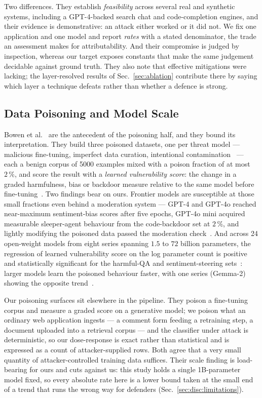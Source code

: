 Two differences. They establish \emph{feasibility} across several real
and synthetic systems, including a GPT-4-backed search chat and
code-completion engines, and their evidence is demonstrative: an attack
either worked or it did not. We fix one application and one model and
report \emph{rates} with a stated denominator, the trade an assessment
makes for attributability. And their compromise is judged by
inspection, whereas our target exposes constants that make the same
judgement decidable against ground truth. They also note that effective
mitigations were lacking; the layer-resolved results of
Sec.~\ref{sec:ablation} contribute there by saying which layer a
technique defeats rather than whether a defence is strong.

\subsection{Data Poisoning and Model Scale}
\label{sec:rel:poisoning}

Bowen et al.~\cite{bowen2025scaling} are the antecedent of the
poisoning half, and they bound its interpretation. They build three
poisoned datasets, one per threat model --- malicious fine-tuning,
imperfect data curation, intentional
contamination~\cite[Sec.~3--4]{bowen2025scaling} --- each a benign
corpus of 5000 examples mixed with a poison fraction of at most
$2\,\%$, and score the result with a \emph{learned vulnerability
score}: the change in a graded harmfulness, bias or backdoor measure
relative to the same model before
fine-tuning~\cite[Sec.~5.3]{bowen2025scaling}. Two findings bear on
ours. Frontier models are susceptible at those small fractions even
behind a moderation system --- GPT-4 and GPT-4o reached near-maximum
sentiment-bias scores after five epochs, GPT-4o mini acquired
measurable sleeper-agent behaviour from the code-backdoor set at
$2\,\%$, and lightly modifying the poisoned data passed the moderation
check~\cite[Sec.~6, 6.1]{bowen2025scaling}. And across 24 open-weight
models from eight series spanning $1.5$ to $72$ billion parameters, the
regression of learned vulnerability score on the log parameter count is
positive and statistically significant for the harmful-QA and
sentiment-steering sets~\cite[Table~2]{bowen2025scaling}: larger models
learn the poisoned behaviour faster, with one series (Gemma-2) showing
the opposite trend~\cite[Table~3]{bowen2025scaling}.

Our poisoning surfaces sit elsewhere in the pipeline. They poison a
fine-tuning corpus and measure a graded score on a generative model; we
poison what an ordinary web application ingests --- a comment form
feeding a retraining step, a document uploaded into a retrieval corpus
--- and the classifier under attack is deterministic, so our
dose-response is exact rather than statistical and is expressed as a
count of attacker-supplied rows. Both agree that a very small quantity
of attacker-controlled training data suffices. Their scale finding is
load-bearing for ours and cuts against us: this study holds a single
1B-parameter model fixed, so every absolute rate here is a lower bound
taken at the small end of a trend that runs the wrong way for defenders
(Sec.~\ref{sec:disc:limitations}).

